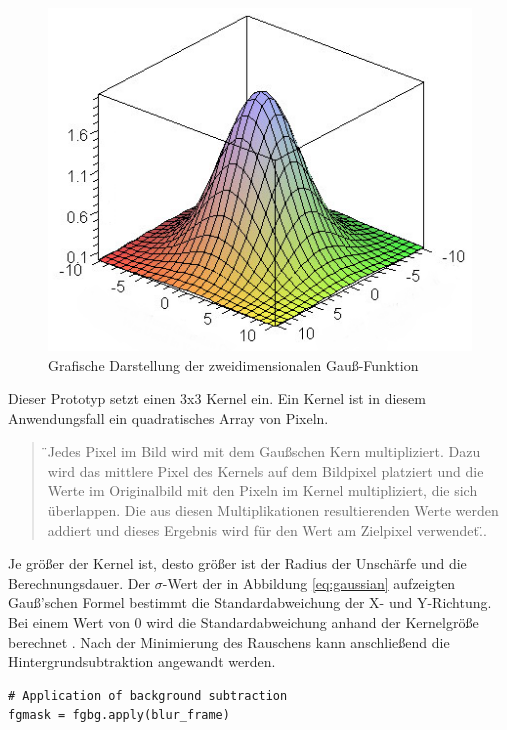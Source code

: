 \begin{figure}[htb]
	\centering
	\includegraphics{images/gaussian_graph}
	\caption[Grafische Darstellung der zweidimensionalen Gauß-Funktion]{Grafische Darstellung der zweidimensionalen Gauß-Funktion\cite{rastergrid}}
	\label{fig:gaussian}
\end{figure}

Dieser Prototyp setzt einen 3x3 Kernel ein. Ein Kernel ist in diesem Anwendungsfall ein quadratisches Array von Pixeln. 
\begin{quote}
	\"{}Jedes Pixel im Bild wird mit dem Gaußschen Kern multipliziert. Dazu wird das mittlere Pixel des Kernels auf dem Bildpixel platziert und die Werte im Originalbild mit den Pixeln im Kernel multipliziert, die sich überlappen. Die aus diesen Multiplikationen resultierenden Werte werden addiert und dieses Ergebnis wird für den Wert am Zielpixel verwendet.\"{}\cite{qastack}. %
\end{quote}

Je größer der Kernel ist, desto größer ist der Radius der Unschärfe und die Berechnungsdauer. Der $\sigma$-Wert der in Abbildung \ref{eq:gaussian} aufzeigten Gauß'schen Formel bestimmt die Standardabweichung der X- und Y-Richtung. Bei einem Wert von 0 wird die Standardabweichung anhand der Kernelgröße berechnet \cite{opencv_smoothing}. Nach der Minimierung des Rauschens kann anschließend die Hintergrundsubtraktion angewandt werden. 

\vspace*{10mm}
\begin{lstlisting}[caption={Anwendung der Hintergrundsubtraktion}, label={lst:bg_subtraction}]
# Application of background subtraction
fgmask = fgbg.apply(blur_frame)
\end{lstlisting}


